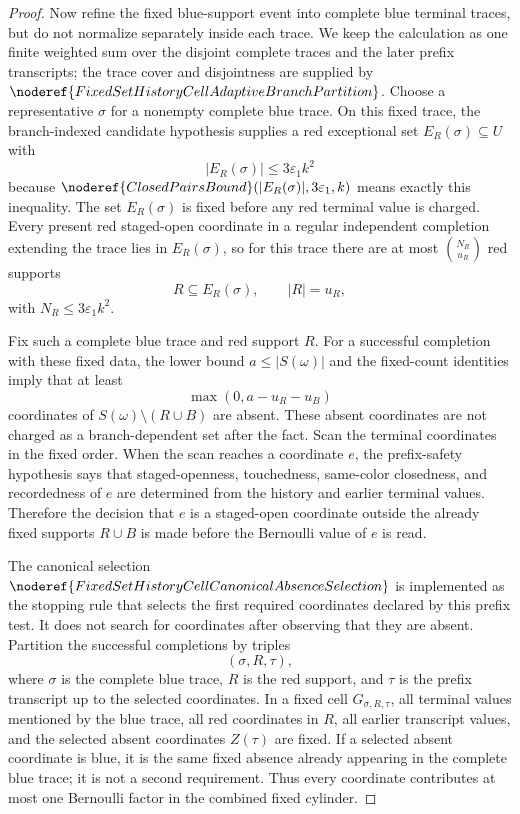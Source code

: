 \begin{proof}
Now refine the fixed blue-support event into complete blue terminal traces,
but do not normalize separately inside each trace.  We keep the calculation
as one finite weighted sum over the disjoint complete traces and the later
prefix transcripts; the trace cover and disjointness are supplied by
\(\noderef{FixedSetHistoryCellAdaptiveBranchPartition}\).  Choose a
representative \(\sigma\) for a nonempty complete blue trace.  On this fixed
trace, the branch-indexed candidate hypothesis supplies a red exceptional set
\(E_R(\sigma)\subseteq U\) with
\[
|E_R(\sigma)|\le 3\varepsilon_1 k^2
\]
because \(\noderef{ClosedPairsBound}( |E_R(\sigma)|,3\varepsilon_1,k)\)
means exactly this inequality.  The set \(E_R(\sigma)\) is fixed before any
red terminal value is charged.  Every present red staged-open coordinate in a
regular independent completion extending the trace lies in \(E_R(\sigma)\),
so for this trace there are at most \(\binom{N_R}{u_R}\) red supports
\[
R\subseteq E_R(\sigma),\qquad |R|=u_R,
\]
with \(N_R\le 3\varepsilon_1k^2\).

Fix such a complete blue trace and red support \(R\).  For a successful
completion with these fixed data, the lower bound \(a\le |S(\omega)|\) and
the fixed-count identities imply that at least
\[
\max(0,a-u_R-u_B)
\]
coordinates of \(S(\omega)\setminus(R\cup B)\) are absent.  These absent
coordinates are not charged as a branch-dependent set after the fact.  Scan
the terminal coordinates in the fixed order.  When the scan reaches a
coordinate \(e\), the prefix-safety hypothesis says that staged-openness,
touchedness, same-color closedness, and recordedness of \(e\) are determined
from the history and earlier terminal values.  Therefore the decision that
\(e\) is a staged-open coordinate outside the already fixed supports
\(R\cup B\) is made before the Bernoulli value of \(e\) is read.

The canonical selection
\(\noderef{FixedSetHistoryCellCanonicalAbsenceSelection}\) is implemented as
the stopping rule that selects the first required coordinates declared by
this prefix test.  It does not search for coordinates after observing that
they are absent.  Partition the successful completions by triples
\[
(\sigma,R,\tau),
\]
where \(\sigma\) is the complete blue trace, \(R\) is the red support, and
\(\tau\) is the prefix transcript up to the selected coordinates.  In a fixed
cell \(G_{\sigma,R,\tau}\), all terminal values mentioned by the blue trace,
all red coordinates in \(R\), all earlier transcript values, and the selected
absent coordinates \(Z(\tau)\) are fixed.  If a selected absent coordinate is
blue, it is the same fixed absence already appearing in the complete blue
trace; it is not a second requirement.  Thus every coordinate contributes at
most one Bernoulli factor in the combined fixed cylinder.


\end{proof}
